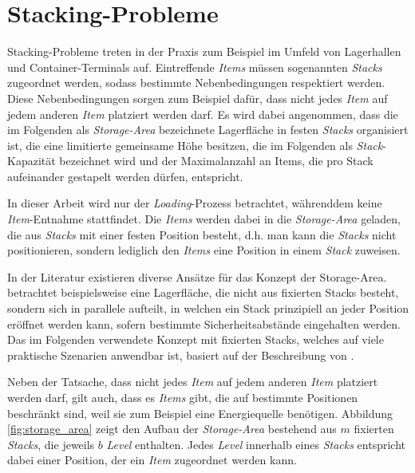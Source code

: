 \section{Stacking-Probleme}
\label{sec:stacking_problems}

Stacking-Probleme treten in der Praxis zum Beispiel im Umfeld von Lagerhallen und Container-Terminals auf.
Eintreffende \textit{Items} müssen sogenannten \textit{Stacks} zugeordnet werden, sodass bestimmte Nebenbedingungen respektiert werden.
Diese Nebenbedingungen sorgen zum Beispiel dafür, dass nicht jedes \textit{Item} auf jedem anderen \textit{Item} platziert werden
darf. Es wird dabei angenommen, dass die im Folgenden als \textit{Storage-Area} bezeichnete Lagerfläche in festen
\textit{Stacks} organisiert ist, die eine limitierte gemeinsame Höhe besitzen, die im Folgenden als \textit{Stack}-Kapazität bezeichnet wird
und der Maximalanzahl an Items, die pro Stack aufeinander gestapelt werden dürfen, entspricht.

In dieser Arbeit wird nur der \textit{Loading}-Prozess betrachtet, währenddem keine \textit{Item}-Entnahme stattfindet.
Die \textit{Items} werden dabei in die \textit{Storage-Area} geladen, die aus \textit{Stacks} mit einer festen Position besteht, d.h.
man kann die \textit{Stacks} nicht positionieren, sondern lediglich den \textit{Items} eine Position in einem \textit{Stack} zuweisen.

In der Literatur existieren diverse Ansätze für das Konzept der Storage-Area.
\citet{Jaehn2013} betrachtet beispielsweise eine Lagerfläche, die nicht aus fixierten Stacks besteht, sondern sich in parallele 
aufteilt, in welchen ein Stack prinzipiell an jeder Position eröffnet werden kann, sofern bestimmte Sicherheitsabstände eingehalten werden.
Das im Folgenden verwendete Konzept mit fixierten Stacks, welches auf viele praktische Szenarien anwendbar ist,
basiert auf der Beschreibung von \citet{Lehnfeld2014}.

Neben der Tatsache, dass nicht jedes \textit{Item} auf jedem anderen \textit{Item} platziert werden darf, gilt auch, dass es \textit{Items} gibt, die auf bestimmte Positionen beschränkt sind, weil sie zum Beispiel eine Energiequelle benötigen.
Abbildung \ref{fig:storage_area} zeigt den Aufbau der \textit{Storage-Area} bestehend aus $m$ fixierten
\textit{Stacks}, die jeweils $b$ \textit{Level} enthalten. Jedes \textit{Level} innerhalb eines \textit{Stacks} entspricht dabei einer Position, der ein \textit{Item} zugeordnet werden kann.

